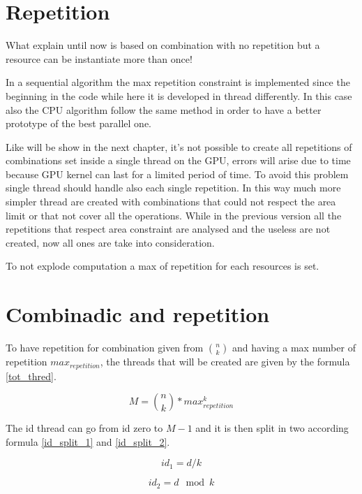 \section{Repetition}

What explain until now is based on combination with no repetition but a resource can be instantiate more than once!

In a sequential algorithm the max repetition constraint is implemented since the beginning in the code while here it is developed in thread differently. In this case also the CPU algorithm follow the same method in order to have a better prototype of the best parallel one.

Like will be show in the next chapter, it's not possible to create all repetitions of combinations set inside a single thread on the GPU, errors will arise due to time because GPU kernel can last for a limited period of time.
To avoid this problem single thread should handle also each single repetition. 
In this way much more simpler thread are created with combinations that could not respect the area limit or that not cover all the operations. 
While in the previous version all the repetitions that respect area constraint are analysed and the useless are not created, now all ones are take into consideration.

To not explode computation a max of repetition for each resources is set.

\section{Combinadic and repetition}

To have repetition for combination given from $\binom{n}{k}$ and having a max number of repetition $max_{repetition}$, the threads that 
will be created are given by the formula \ref{tot_thred}.

\begin{equation}
    M = \binom{n}{k} * max_{repetition}^k
    \label{tot_thred}
\end{equation}

The id thread can go from id zero to $M-1$ and it is then split in two according formula \ref{id_split_1} and \ref{id_split_2}.

\begin{equation}
    id_1 = d/k 
    \label{id_split_1}
\end{equation}

\begin{equation}
    id_2 = d\mod{k}
    \label{id_split_2}
\end{equation}

